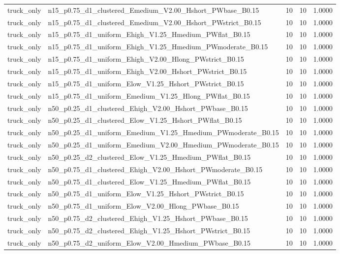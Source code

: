 \begin{tabular}{llrrr}
truck_only & n15_p0.75_d1_clustered_Emedium_V2.00_Hshort_PWbase_B0.15 & 10 & 10 & 1.0000 \\
truck_only & n15_p0.75_d1_clustered_Emedium_V2.00_Hshort_PWstrict_B0.15 & 10 & 10 & 1.0000 \\
truck_only & n15_p0.75_d1_uniform_Ehigh_V1.25_Hmedium_PWflat_B0.15 & 10 & 10 & 1.0000 \\
truck_only & n15_p0.75_d1_uniform_Ehigh_V1.25_Hmedium_PWmoderate_B0.15 & 10 & 10 & 1.0000 \\
truck_only & n15_p0.75_d1_uniform_Ehigh_V2.00_Hlong_PWstrict_B0.15 & 10 & 10 & 1.0000 \\
truck_only & n15_p0.75_d1_uniform_Ehigh_V2.00_Hshort_PWstrict_B0.15 & 10 & 10 & 1.0000 \\
truck_only & n15_p0.75_d1_uniform_Elow_V1.25_Hshort_PWstrict_B0.15 & 10 & 10 & 1.0000 \\
truck_only & n15_p0.75_d1_uniform_Emedium_V1.25_Hlong_PWflat_B0.15 & 10 & 10 & 1.0000 \\
truck_only & n50_p0.25_d1_clustered_Ehigh_V2.00_Hshort_PWbase_B0.15 & 10 & 10 & 1.0000 \\
truck_only & n50_p0.25_d1_clustered_Elow_V1.25_Hshort_PWflat_B0.15 & 10 & 10 & 1.0000 \\
truck_only & n50_p0.25_d1_uniform_Emedium_V1.25_Hmedium_PWmoderate_B0.15 & 10 & 10 & 1.0000 \\
truck_only & n50_p0.25_d1_uniform_Emedium_V2.00_Hmedium_PWmoderate_B0.15 & 10 & 10 & 1.0000 \\
truck_only & n50_p0.25_d2_clustered_Elow_V1.25_Hmedium_PWflat_B0.15 & 10 & 10 & 1.0000 \\
truck_only & n50_p0.75_d1_clustered_Ehigh_V2.00_Hshort_PWmoderate_B0.15 & 10 & 10 & 1.0000 \\
truck_only & n50_p0.75_d1_clustered_Elow_V1.25_Hmedium_PWflat_B0.15 & 10 & 10 & 1.0000 \\
truck_only & n50_p0.75_d1_uniform_Elow_V1.25_Hshort_PWstrict_B0.15 & 10 & 10 & 1.0000 \\
truck_only & n50_p0.75_d1_uniform_Elow_V2.00_Hlong_PWbase_B0.15 & 10 & 10 & 1.0000 \\
truck_only & n50_p0.75_d2_clustered_Ehigh_V1.25_Hshort_PWbase_B0.15 & 10 & 10 & 1.0000 \\
truck_only & n50_p0.75_d2_clustered_Ehigh_V1.25_Hshort_PWstrict_B0.15 & 10 & 10 & 1.0000 \\
truck_only & n50_p0.75_d2_uniform_Elow_V2.00_Hmedium_PWbase_B0.15 & 10 & 10 & 1.0000 \\
\bottomrule
\end{tabular}
